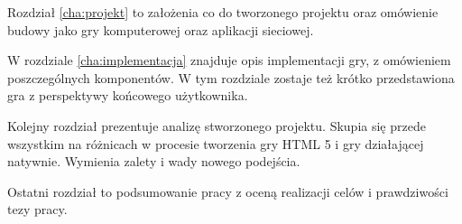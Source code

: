 Rozdział \ref{cha:projekt} to założenia co do tworzonego projektu oraz omówienie budowy jako
gry komputerowej oraz aplikacji sieciowej.

W rozdziale \ref{cha:implementacja} znajduje opis implementacji gry, z omówieniem poszczególnych
komponentów. W tym rozdziale zostaje też krótko przedstawiona gra z perspektywy końcowego
użytkownika.

Kolejny rozdział prezentuje analizę stworzonego projektu. Skupia się przede wszystkim na różnicach
w procesie tworzenia gry HTML 5 i gry działającej natywnie. Wymienia zalety i wady nowego podejścia.

Ostatni rozdział to podsumowanie pracy z oceną realizacji celów i prawdziwości tezy pracy.












